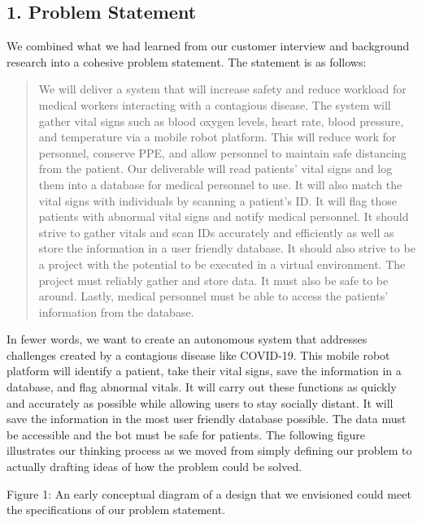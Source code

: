﻿\documentclass[10pt]{article}
\begin{document}
\subsection{1. Problem Statement}
We combined what we had learned from our customer interview and background research into a cohesive problem statement. The statement is as follows:
\begin{quote}        
We will deliver a system that will increase safety and reduce workload for medical workers interacting with a contagious disease. The system will gather vital signs such as blood oxygen levels, heart rate, blood pressure, and temperature via a mobile robot platform. This will reduce work for personnel, conserve PPE, and allow personnel to maintain safe distancing from the patient. Our deliverable will read patients’ vital signs and log them into a database for medical personnel to use. It will also match the vital signs with individuals by scanning a patient’s ID. It will flag those patients with abnormal vital signs and notify medical personnel. It should strive to gather vitals and scan IDs accurately and efficiently as well as store the information in a user friendly database. It should also strive to be a project with the potential to be executed in a virtual environment. The project must reliably gather and store data. It must also be safe to be around. Lastly, medical personnel must be able to access the patients’ information from the database. 
\end{quote}

In fewer words, we want to create an autonomous system that addresses challenges created by a contagious disease like COVID-19. This mobile robot platform will identify a patient, take their vital signs, save the information in a database, and flag abnormal vitals. It will carry out these functions as quickly and accurately as possible while allowing users to stay socially distant. It will save the information in the most user friendly database possible. The data must be accessible and the bot must be safe for patients. The following figure illustrates our thinking process as we moved from simply defining our problem to actually drafting ideas of how the problem could be solved.
  

Figure 1: An early conceptual diagram of a design that we envisioned could meet the specifications of our problem statement.
\end{document}

